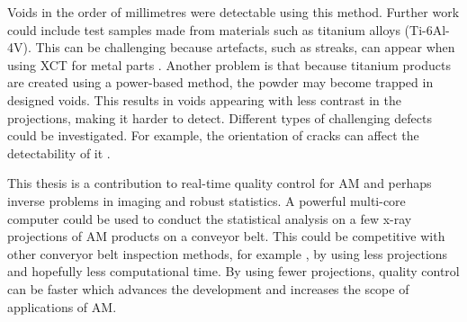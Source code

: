 \documentclass[12pt, a4paper, twoside]{memoir}
\begin{document}
Voids in the order of millimetres were detectable using this method. Further work could include test samples made from materials such as titanium alloys (Ti-6Al-4V). This can be challenging because artefacts, such as streaks, can appear when using XCT for metal parts \citep{deman1998metal, nawaz2014metal}. Another problem is that because titanium products are created using a power-based method, the powder may become trapped \citep{brierley2018optimized} in designed voids. This results in voids appearing with less contrast in the projections, making it harder to detect. Different types of challenging defects could be investigated. For example, the orientation of cracks can affect the detectability of it \citep{wooldridge1997demonstrating}.

This thesis is a contribution to real-time quality control for AM and perhaps inverse problems in imaging \citep{bertero1998introduction} and robust statistics. A powerful multi-core computer could be used to conduct the statistical analysis on a few x-ray projections of AM products on a conveyor belt. This could be competitive with other converyor belt inspection methods, for example \cite{warnett2016towards}, by using less projections and hopefully less computational time. By using fewer projections, quality control can be faster which advances the development and increases the scope of applications of AM.




\begin{appendices}

\end{appendices}
\end{document}
